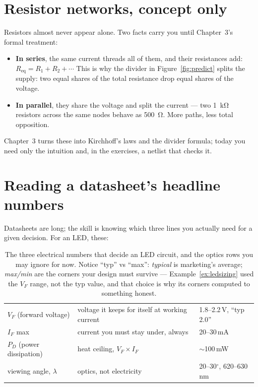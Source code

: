\section{Resistor networks, concept only}
\label{sec:networks}

Resistors almost never appear alone. Two facts carry you until Chapter~3's
formal treatment:
\begin{itemize}
\item \textbf{In series}, the same current threads all of them,
and their resistances add: $R_{\mathrm{eq}} = R_1 + R_2 + \cdots$ This is why
the divider in Figure~\ref{fig:predict} splits the supply: two equal shares
of the total resistance drop equal shares of the voltage.
\item \textbf{In parallel}, they share the voltage and split
the current — two \qty{1}{\kilo\ohm} resistors across the same nodes behave
as \qty{500}{\ohm}. More paths, less total opposition.
\end{itemize}
Chapter~3 turns these into Kirchhoff's laws and the divider formula; today
you need only the intuition and, in the exercises, a netlist that checks it.

\section{Reading a datasheet's headline numbers}
\label{sec:datasheet}

Datasheets are long; the skill is knowing which three lines you actually
need for a given decision. For an LED, these:

\begin{table}[htbp]
\centering\small
\begin{tabularx}{\linewidth}{lYl}
\toprule
{} &  & \\
\midrule
$V_F$ (forward voltage) & voltage it keeps for itself at working current & 1.8--2.2\,V, ``typ 2.0''\\
$I_F$ max & current you must stay under, always & 20--30\,mA\\
$P_D$ (power dissipation) & heat ceiling, $V_F \times I_F$ & $\sim$100\,mW\\
\midrule
viewing angle, $\lambda$ & optics, not electricity & 20--30$^\circ$, 620--630\,nm\\
\bottomrule
\end{tabularx}
\caption{The three electrical numbers that decide an LED circuit, and the
optics rows you may ignore for now. Notice ``typ'' vs ``max'': \emph{typical}
is marketing's average; \emph{max/min} are the corners your design must
survive — Example~\ref{ex:ledsizing} used the $V_F$ range, not the typ
value, and that choice is why its corners computed to something honest.}
\label{tab:datasheet}
\end{table}

